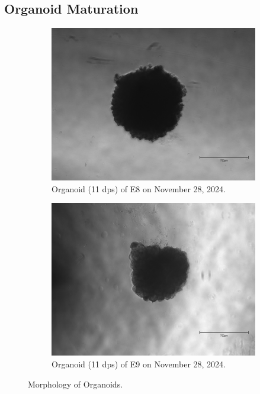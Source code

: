 \documentclass[11pt]{article}
\begin{document}
\subsection{Organoid Maturation}

\begin{figure}[H]
    \centering
    \begin{subfigure}[b]{0.40\textwidth}
        \centering
        \includegraphics[width=\textwidth]{Sandra_b1711_emb25_1_4.jpeg}
        \caption{Organoid (11 dps) of E8 on November 28, 2024.}
        \label{fig:Sandra_b1711_emb25_1_4}
    \end{subfigure}
    \hfill
    \begin{subfigure}[b]{0.40\textwidth}
        \centering
        \includegraphics[width=\textwidth]{Sandra_b1711_emb25_late_3_6.jpeg}
        \caption{Organoid (11 dps) of E9 on November 28, 2024.}
        \label{fig:Sandra_b1711_emb25_late_3_6}
    \end{subfigure}
    \caption{Morphology of Organoids.}
\end{figure}
\end{document}
